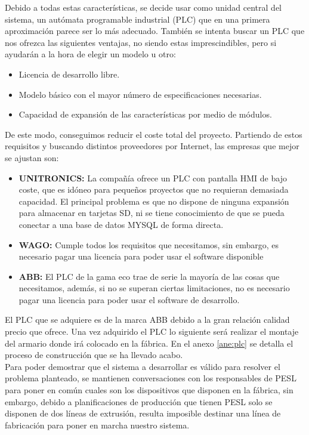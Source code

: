 Debido a todas estas características, se decide usar como unidad central del sistema, un autómata programable industrial (PLC) que en una primera aproximación parece ser lo más adecuado. También se intenta buscar un PLC que nos ofrezca las siguientes ventajas, no siendo estas imprescindibles, pero si ayudarán a la hora de elegir un modelo u otro:

\begin{itemize}
		\item{Licencia de desarrollo libre.}
		\item{Modelo básico con el mayor número de especificaciones necesarias.}
		\item{Capacidad de expansión de las características por medio de módulos.}
\end{itemize}

De este modo, conseguimos reducir el coste total del proyecto. Partiendo de estos requisitos y buscando distintos proveedores por Internet, las empresas que mejor se ajustan son:

\begin{itemize}
		\item{\textbf{UNITRONICS:} La compañía ofrece un PLC con pantalla HMI de bajo coste, que es idóneo para pequeños proyectos que no requieran demasiada capacidad. El principal problema es que no dispone de ninguna expansión para almacenar en tarjetas SD, ni se tiene conocimiento de que se pueda conectar a una base de datos MYSQL de forma directa.}
		\item{\textbf{WAGO:} Cumple todos los requisitos que necesitamos, sin embargo, es necesario pagar una licencia para poder usar el software disponible}
		\item{\textbf{ABB:} El PLC de la gama eco trae de serie la mayoría de las cosas que necesitamos, además, si no se superan ciertas limitaciones, no es necesario pagar una licencia para poder usar el software de desarrollo.}
\end{itemize}

El PLC que se adquiere es de la marca ABB debido a la gran relación calidad precio que ofrece. Una vez adquirido el PLC lo siguiente será realizar el montaje del armario donde irá colocado en la fábrica. En el anexo \ref{ane:plc} se detalla el proceso de construcción que se ha llevado acabo.\\

Para poder demostrar que el sistema a desarrollar es válido para resolver el problema planteado, se mantienen conversaciones con los responsables de PESL para poner en común cuales son los dispositivos que disponen en la fábrica, sin embargo, debido a planificaciones de producción que tienen PESL solo se disponen de dos líneas de extrusión, resulta imposible destinar una línea de fabricación para poner en marcha nuestro sistema.\\

